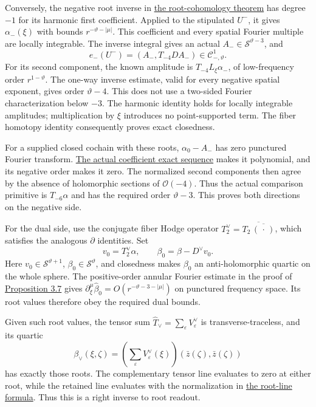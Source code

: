 \documentclass[
  english,
  11pt,
  reqno]{amsart}
\begin{document}
Conversely, the negative root inverse in
\hyperref[thm:online-moderate-root-cohomology]{the root-cohomology
theorem} has degree \(-1\) for its harmonic first coefficient. Applied
to the stipulated \(U^-\), it gives \(\alpha_-(\xi)\) with bounds
\(r^{-\vartheta-|\mu|}\). This coefficient and every spatial Fourier
multiple are locally integrable. The inverse integral gives an actual
\(A_-\in\mathscr S^{\vartheta-3}\), and%
\[
e_-(U^-)
=(A_-,T_{-4}D A_-)
\in\mathscr C_{-,\vartheta}^1 .
\] For its second component, the known amplitude is
\(T_{-4}L_\xi\alpha_-\), of low-frequency order \(r^{1-\vartheta}\). The
one-way inverse estimate, valid for every negative spatial exponent,
gives order \(\vartheta-4\). This does not use a two-sided Fourier
characterization below \(-3\). The harmonic identity holds for locally
integrable amplitudes; multiplication by \(\xi\) introduces no
point-supported term. The fiber homotopy identity consequently proves
exact closedness.

For a supplied closed cochain with these roots, \(\alpha_0-A_-\) has
zero punctured Fourier transform.
\hyperref[prop:online-actual-coefficient-exact-sequence]{The actual
coefficient exact sequence} makes it polynomial, and its negative order
makes it zero. The normalized second components then agree by the
absence of holomorphic sections of \(\mathcal O(-4)\). Thus the actual
comparison primitive is \(T_{-6}\alpha\) and has the required order
\(\vartheta-3\). This proves both directions on the negative side.

For the dual side, use the conjugate fiber Hodge operator
\(T_2^\vee=\overline{T_2\,\overline{(\,\cdot\,)}}\), which satisfies the
analogous \(\partial\) identities. Set%
 \[
v_0=T_2^\vee\alpha,\qquad
\beta_0=\beta-D^\vee v_0.
\] Here \(v_0\in\mathscr S^{\vartheta+1}\),
\(\beta_0\in\mathscr S^\vartheta\), and closedness makes \(\beta_0\) an
anti-holomorphic quartic on the whole sphere. The positive-order annular
Fourier estimate in the proof of
\hyperref[prop:online-actual-coefficient-exact-sequence]{Proposition
3.7} gives \(\partial_\xi^\mu\widehat\beta_0=O(r^{-\vartheta-3-|\mu|})\)
on punctured frequency space. Its root values therefore obey the
required dual bounds.

Given such root values, the tensor sum
\(\widehat T_\vee=\sum_\varepsilon V^\vee_\varepsilon\) is
transverse-traceless, and its quartic%
 \[
\beta_\vee(\xi,\zeta)
=\left(\sum_\varepsilon V^\vee_\varepsilon(\xi)\right)
  (\bar z(\zeta),\bar z(\zeta))
\] has exactly those roots. The complementary tensor line evaluates to
zero at either root, while the retained line evaluates with the
normalization in \hyperref[eq:online-dual-root-line-normalizations]{the
root-line formula}. Thus this is a right inverse to root readout.
\end{document}
